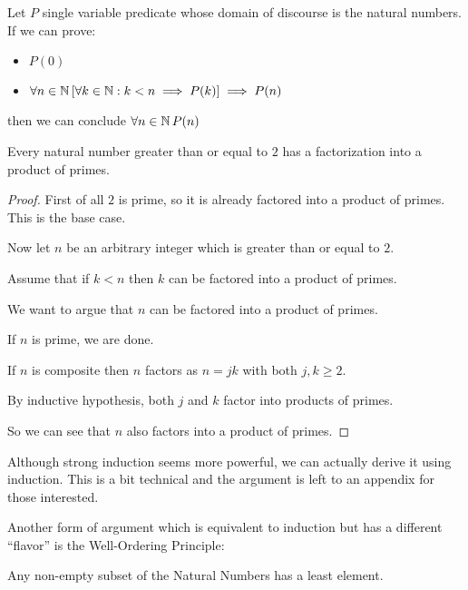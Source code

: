 \begin{principle}
	Let $P$ single variable predicate whose domain of discourse is the natural numbers.  If we can prove:
	
	\begin{itemize}
		\item $P(0)$
		\item $\forall n \in \mathbb{N}  \,[\forall k \in \mathbb{N}: k < n \implies P(k)] \implies P(n)$
	\end{itemize}
	
	then we can conclude $\forall n \in \mathbb{N} \, P(n)$
\end{principle}

\begin{theorem}
	Every natural number greater than or  equal to $2$ has a factorization into a product of primes.
	\end{theorem}

\begin{proof}
		First of all $2$ is prime, so it is already factored into a product of primes.  This is the base case.
		
		Now let $n$ be an arbitrary integer which is greater than or equal to $2$.
		
		Assume that if $k<n$ then $k$ can be factored into a product of primes.
		
		We want to argue that $n$ can be factored into a product of primes.
		
		If $n$ is prime, we are done.
		
		If $n$ is composite then $n$ factors as $n = jk$ with both $j,k \geq 2$.
		
		By inductive hypothesis, both $j$ and $k$ factor into products of primes.
		
		So we can see that $n$ also factors into a product of primes. 
	\end{proof}

Although strong induction seems more powerful, we can actually derive it using induction.  This is a bit technical and the argument is left to an appendix for those interested.

Another form of argument which is equivalent to induction but has a different ``flavor'' is the Well-Ordering Principle:

\begin{principle}
		Any non-empty subset of the Natural Numbers has a least element.
	\end{principle}

